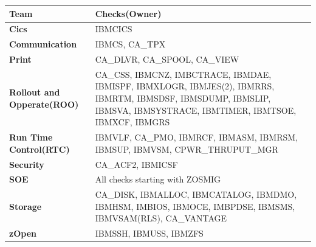 \begin{table}[]
	\begin{tabular}{|l|p{9cm}|}
		\hline
		\textbf{Team}                      & \textbf{Checks(Owner)}                                                                                                                                                 \\ \hline
		\textbf{Cics}                      & IBMCICS                                                                                                                                                                \\ \hline
		\textbf{Communication}             & IBMCS, CA\_TPX                                                                                                                                                         \\ \hline
		\textbf{Print}                     & CA\_DLVR, CA\_SPOOL, CA\_VIEW                                                                                                                                          \\ \hline
		\textbf{Rollout and Opperate(ROO)} & CA\_CSS, IBMCNZ,  IMBCTRACE, IBMDAE, IBMISPF, IBMXLOGR, IBMJES(2), IBMRRS, IBMRTM, IBMSDSF, IBMSDUMP, IBMSLIP, IBMSVA, IBMSYSTRACE, IBMTIMER, IBMTSOE,  IBMXCF, IBMGRS \\ \hline
		\textbf{Run Time Control(RTC)}     & IBMVLF, CA\_PMO, IBMRCF, IBMASM, IBMRSM, IBMSUP, IBMVSM,  CPWR\_THRUPUT\_MGR                                                                                           \\ \hline
		\textbf{Security}                  & CA\_ACF2, IBMICSF                                                                                                                                                      \\ \hline
		\textbf{SOE}                       & All checks starting with ZOSMIG                                                                                                                                        \\ \hline
		\textbf{Storage}                   & CA\_DISK, IBMALLOC, IBMCATALOG, IBMDMO, IBMHSM, IMBIOS, IBMOCE, IMBPDSE, IBMSMS, IBMVSAM(RLS), CA\_VANTAGE                                                             \\ \hline
		\textbf{zOpen}                     & IBMSSH, IBMUSS, IBMZFS                                                                                                                                                 \\ \hline

\end{tabular}
\end{table}
